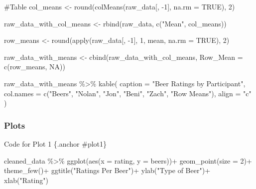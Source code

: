 \documentclass[
  12,
  letterpaper,
  DIV=11,
  numbers=noendperiod]{scrartcl}
\newenvironment{Shaded}{\begin{snugshade}}{\end{snugshade}}
\newcommand{\AttributeTok}[1]{\textcolor[rgb]{0.40,0.45,0.13}{#1}}
\newcommand{\CommentTok}[1]{\textcolor[rgb]{0.37,0.37,0.37}{#1}}
\newcommand{\ConstantTok}[1]{\textcolor[rgb]{0.56,0.35,0.01}{#1}}
\newcommand{\DecValTok}[1]{\textcolor[rgb]{0.68,0.00,0.00}{#1}}
\newcommand{\FunctionTok}[1]{\textcolor[rgb]{0.28,0.35,0.67}{#1}}
\newcommand{\NormalTok}[1]{\textcolor[rgb]{0.00,0.23,0.31}{#1}}
\newcommand{\OtherTok}[1]{\textcolor[rgb]{0.00,0.23,0.31}{#1}}
\newcommand{\SpecialCharTok}[1]{\textcolor[rgb]{0.37,0.37,0.37}{#1}}
\newcommand{\StringTok}[1]{\textcolor[rgb]{0.13,0.47,0.30}{#1}}
\begin{document}
\begin{Shaded}
\begin{Highlighting}[]
\CommentTok{\#Table}
\NormalTok{col\_means }\OtherTok{\textless{}{-}} \FunctionTok{round}\NormalTok{(}\FunctionTok{colMeans}\NormalTok{(raw\_data[, }\SpecialCharTok{{-}}\DecValTok{1}\NormalTok{], }\AttributeTok{na.rm =} \ConstantTok{TRUE}\NormalTok{), }\DecValTok{2}\NormalTok{)}

\NormalTok{raw\_data\_with\_col\_means }\OtherTok{\textless{}{-}} \FunctionTok{rbind}\NormalTok{(raw\_data, }\FunctionTok{c}\NormalTok{(}\StringTok{"Mean"}\NormalTok{, col\_means))}

\NormalTok{row\_means }\OtherTok{\textless{}{-}} \FunctionTok{round}\NormalTok{(}\FunctionTok{apply}\NormalTok{(raw\_data[, }\SpecialCharTok{{-}}\DecValTok{1}\NormalTok{], }\DecValTok{1}\NormalTok{, mean, }\AttributeTok{na.rm =} \ConstantTok{TRUE}\NormalTok{), }\DecValTok{2}\NormalTok{)}

\NormalTok{raw\_data\_with\_means }\OtherTok{\textless{}{-}} \FunctionTok{cbind}\NormalTok{(raw\_data\_with\_col\_means, }\AttributeTok{Row\_Mean =} \FunctionTok{c}\NormalTok{(row\_means, }\ConstantTok{NA}\NormalTok{))}

\NormalTok{raw\_data\_with\_means }\SpecialCharTok{\%\textgreater{}\%}
  \FunctionTok{kable}\NormalTok{(}
    \AttributeTok{caption =} \StringTok{"Beer Ratings by Participant"}\NormalTok{,}
    \AttributeTok{col.names =} \FunctionTok{c}\NormalTok{(}\StringTok{"Beers"}\NormalTok{, }\StringTok{"Nolan"}\NormalTok{, }\StringTok{"Jon"}\NormalTok{, }\StringTok{"Beni"}\NormalTok{, }\StringTok{"Zach"}\NormalTok{, }\StringTok{"Row Means"}\NormalTok{),}
    \AttributeTok{align =} \StringTok{"c"}
\NormalTok{  )}
\end{Highlighting}
\end{Shaded}

\hypertarget{plots}{%
\subsubsection{Plots}\label{plots}}

Code for Plot 1 \{.anchor \#plot1\}

\begin{Shaded}
\begin{Highlighting}[]
\NormalTok{cleaned\_data }\SpecialCharTok{\%\textgreater{}\%} 
  \FunctionTok{ggplot}\NormalTok{(}\FunctionTok{aes}\NormalTok{(}\AttributeTok{x =}\NormalTok{ rating,}
             \AttributeTok{y =}\NormalTok{ beers))}\SpecialCharTok{+}
  \FunctionTok{geom\_point}\NormalTok{(}\AttributeTok{size =} \DecValTok{2}\NormalTok{)}\SpecialCharTok{+}
  \FunctionTok{theme\_few}\NormalTok{()}\SpecialCharTok{+}
  \FunctionTok{ggtitle}\NormalTok{(}\StringTok{"Ratings Per Beer"}\NormalTok{)}\SpecialCharTok{+}
  \FunctionTok{ylab}\NormalTok{(}\StringTok{"Type of Beer"}\NormalTok{)}\SpecialCharTok{+}
  \FunctionTok{xlab}\NormalTok{(}\StringTok{"Rating"}\NormalTok{)}
\end{Highlighting}
\end{Shaded}
\end{document}
